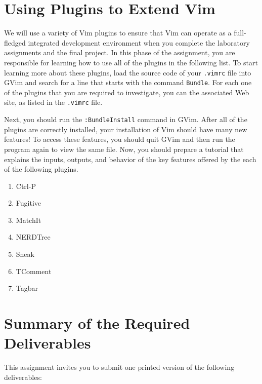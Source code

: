 \section*{Using Plugins to Extend Vim}

We will use a variety of Vim plugins to ensure that Vim can operate as a full-fledged integrated development environment
when you complete the laboratory assignments and the final project.  In this phase of the assignment, you are
responsible for learning how to use all of the plugins in the following list.  To start learning more about these plugins, load
the source code of your {\tt .vimrc} file into GVim and search for a line that starts with the command {\tt Bundle}.  For
each one of the plugins that you are required to investigate, you can the associated Web site, as listed in the {\tt .vimrc} file. 

Next, you should run the {\tt :BundleInstall} command in GVim.  After all of the plugins are correctly installed, your
installation of Vim should have many new features! To access these features, you should quit GVim and then run the program again
to view the same file.  Now, you should prepare a tutorial that explains the inputs, outputs, and behavior of the key features
offered by the each of the following plugins.

\begin{enumerate}

  \item Ctrl-P 
  \item Fugitive
  \item MatchIt
  \item NERDTree
  \item Sneak
  \item TComment
  \item Tagbar

\end{enumerate}



\section*{Summary of the Required Deliverables}

  This assignment invites you to submit one printed version of the following deliverables:

